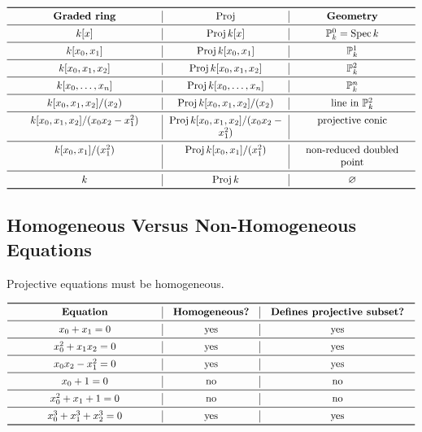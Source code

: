 \documentclass[12pt,a4paper]{article}
\DeclareMathOperator{\Spec}{Spec}
\DeclareMathOperator{\Proj}{Proj}
\newcommand{\PP}{\mathbb P}
\theoremstyle{notespace}
\begin{document}
\[
\begin{array}{>{\centering\arraybackslash}p{5cm}
		|>{\centering\arraybackslash}p{4cm}
		|>{\centering\arraybackslash}p{4cm}}
	\toprule
	\textbf{Graded ring} & \textbf{\(\Proj\)} & \textbf{Geometry} \\
	\midrule
	\(k[x]\)
	&
	\(\Proj k[x]\)
	&
	\(\PP_k^0=\Spec k\)
	\\
	\midrule
	\(k[x_0,x_1]\)
	&
	\(\Proj k[x_0,x_1]\)
	&
	\(\PP_k^1\)
	\\
	\midrule
	\(k[x_0,x_1,x_2]\)
	&
	\(\Proj k[x_0,x_1,x_2]\)
	&
	\(\PP_k^2\)
	\\
	\midrule
	\(k[x_0,\dots,x_n]\)
	&
	\(\Proj k[x_0,\dots,x_n]\)
	&
	\(\PP_k^n\)
	\\
	\midrule
	\(k[x_0,x_1,x_2]/(x_2)\)
	&
	\(\Proj k[x_0,x_1,x_2]/(x_2)\)
	&
	line in \(\PP_k^2\)
	\\
	\midrule
	\(k[x_0,x_1,x_2]/(x_0x_2-x_1^2)\)
	&
	\(\Proj k[x_0,x_1,x_2]/(x_0x_2-x_1^2)\)
	&
	projective conic
	\\
	\midrule
	\(k[x_0,x_1]/(x_1^2)\)
	&
	\(\Proj k[x_0,x_1]/(x_1^2)\)
	&
	non-reduced doubled point
	\\
	\midrule
	\(k\)
	&
	\(\Proj k\)
	&
	\(\varnothing\)
	\\
	\bottomrule
\end{array}
\]

\subsection{Homogeneous Versus Non-Homogeneous Equations}

Projective equations must be homogeneous.

\[
\begin{array}{>{\centering\arraybackslash}p{5cm}
		|>{\centering\arraybackslash}p{3cm}
		|>{\centering\arraybackslash}p{5cm}}
	\toprule
	\textbf{Equation} & \textbf{Homogeneous?} & \textbf{Defines projective subset?} \\
	\midrule
	\(x_0+x_1=0\)
	&
	yes
	&
	yes
	\\
	\midrule
	\(x_0^2+x_1x_2=0\)
	&
	yes
	&
	yes
	\\
	\midrule
	\(x_0x_2-x_1^2=0\)
	&
	yes
	&
	yes
	\\
	\midrule
	\(x_0+1=0\)
	&
	no
	&
	no
	\\
	\midrule
	\(x_0^2+x_1+1=0\)
	&
	no
	&
	no
	\\
	\midrule
	\(x_0^3+x_1^3+x_2^3=0\)
	&
	yes
	&
	yes
	\\
	\bottomrule
\end{array}
\]
\end{document}
